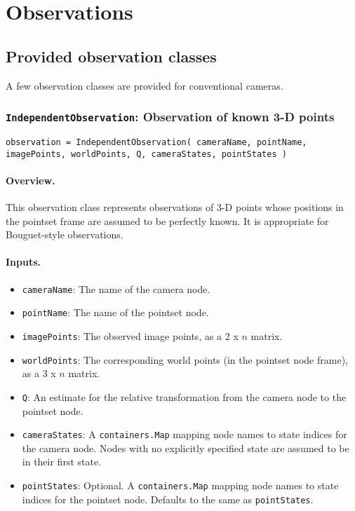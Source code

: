 \section{Observations} \label{sec:observations}

\subsection{Provided observation classes}

A few observation classes are provided for conventional cameras.

\subsubsection{\texttt{IndependentObservation}: Observation of known 3-D points}

\texttt{observation = IndependentObservation( cameraName, pointName, imagePoints, worldPoints, Q, cameraStates, pointStates )}

\paragraph{Overview.} This observation class represents observations of 3-D points whose positions in the 
pointset frame are assumed to be perfectly known. It is appropriate for Bouguet-style observations.

\paragraph{Inputs.}
\begin{itemize}
	\item \texttt{cameraName}: The name of the camera node.
	\item \texttt{pointName}: The name of the pointset node.
    \item \texttt{imagePoints}: The observed image points, as a 2 x $n$ matrix.
    \item \texttt{worldPoints}: The corresponding world points (in the pointset node frame), as a 3 x $n$ matrix.
    \item \texttt{Q}: An estimate for the relative transformation from the camera node to the pointset node.
    \item \texttt{cameraStates}: A \texttt{containers.Map} mapping node names to state indices for the camera node. 
        Nodes with no explicitly specified state are assumed to be in their first state.
    \item \texttt{pointStates}: Optional. A \texttt{containers.Map} mapping node names to state indices for the pointset node. 
        Defaults to the same as \texttt{pointStates}.
\end{itemize}
